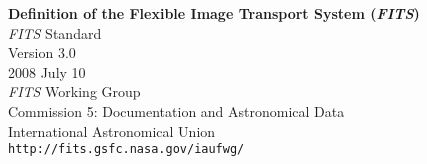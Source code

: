 \documentclass[11pt,makeidx]{book}     %
\begin{document}
 

\newcommand{\keyw}[1]{\hbox{{\tt #1}}}
\newcommand{\keyi}[2]{\hbox{{\tt #1\hspace{1pt}}{$#2$}\/}}
\newcommand{\CRPIX}[1]{\keyi{CRPIX}{#1}}
\newcommand{\CDELT}[1]{\keyi{CDELT}{#1}}
\newcommand{\CRVAL}[1]{\keyi{CRVAL}{#1}}
\newcommand{\CTYPE}[1]{\keyi{CTYPE}{#1}}
\newcommand{\CUNIT}[1]{\keyi{CUNIT}{#1}}
\newcommand{\NAXIS}[1]{\keyi{NAXIS}{#1}}
\newcommand{\CROTA}[1]{\keyi{CROTA}{#1}}
\newcommand{\keyii}[3]{\hbox{{\tt #1\hspace{1pt}{$#2$}\_{$#3$}}\/}}
\newcommand{\PC}[2]{\keyii{PC}{#1}{#2}}
\newcommand{\CD}[2]{\keyii{CD}{#1}{#2}}
\newcommand{\PV}[2]{\keyii{PV}{#1}{#2}}
\newcommand{\PS}[2]{\keyii{PS}{#1}{#2}}
\newcommand{\keyv}[1]{\hbox{{\tt #1}}}
\newcommand{\PCij}{\PC{i}{j}}
\newcommand{\CDij}{\CD{i}{j}}
\newcommand{\Ci}{{\it a\/}}
\newcommand{\NN}[1]{\noalign{\noindent{#1}}\noalign{\vspace{4pt}}}

\newcommand{\kwd}[1]{\texttt{#1}}
\newcommand{\kwdalt}[1]{\kwd{#1}\textit{a}}
\newcommand{\indxkw}[2]{\texttt{#1}\textit{#2}}
\newcommand{\indxkwdalt}[2]{\indxkw{#1}{#2}\textit{a}}
\newcommand{\dindxkw}[3]{\textit{#1}\/\indxkw{#2}{#3}}
\newcommand{\dindxkwalt}[3]{\dindxkw{#1}{#2}{#3}\textit{a}}

\newcommand\degr{\arcdeg}%
\newcommand\arcdeg{\mbox{$^\circ$}}%

\begin{titlepage}
\begin{center}

\vspace*{2.5cm}
{\LARGE \bf Definition of the Flexible Image Transport System ({\em FITS\/})} \\


\vspace{3.0cm}
{\em FITS\/} Standard \\

\vspace{0.8cm}
Version 3.0 \\

\vspace{0.6cm}
2008 July 10 \\

\vspace{4.0cm}
 {\em FITS\/} Working Group \\
Commission 5: Documentation and Astronomical Data \\
International Astronomical Union \\
{\tt http://fits.gsfc.nasa.gov/iaufwg/} \\

\end{center}
\end{titlepage}
\end{document}
